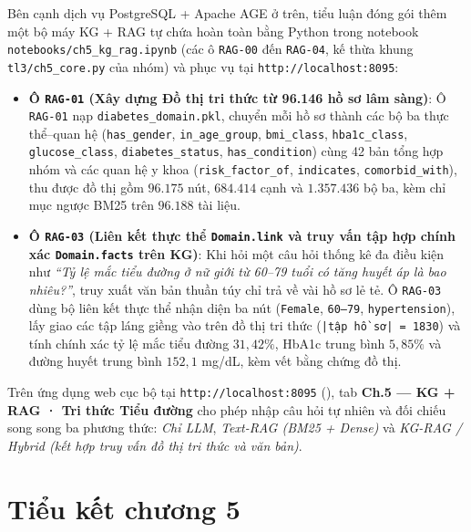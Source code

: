 Bên cạnh dịch vụ PostgreSQL + Apache AGE ở trên, tiểu luận đóng gói thêm một bộ máy KG + RAG tự chứa hoàn toàn bằng Python trong notebook \texttt{notebooks/ch5\_kg\_rag.ipynb} (các ô \texttt{RAG-00} đến \texttt{RAG-04}, kế thừa khung \texttt{tl3/ch5\_core.py} của nhóm) và phục vụ tại \texttt{http://localhost:8095}:
\begin{itemize}
  \item \textbf{Ô \texttt{RAG-01} (Xây dựng Đồ thị tri thức từ 96.146 hồ sơ lâm sàng)}: Ô \texttt{RAG-01} nạp \texttt{diabetes\_domain.pkl}, chuyển mỗi hồ sơ thành các bộ ba thực thể–quan hệ (\texttt{has\_gender}, \texttt{in\_age\_group}, \texttt{bmi\_class}, \texttt{hba1c\_class}, \texttt{glucose\_class}, \texttt{diabetes\_status}, \texttt{has\_condition}) cùng 42 bản tổng hợp nhóm và các quan hệ y khoa (\texttt{risk\_factor\_of}, \texttt{indicates}, \texttt{comorbid\_with}), thu được đồ thị gồm $96.175$ nút, $684.414$ cạnh và $1.357.436$ bộ ba, kèm chỉ mục ngược BM25 trên $96.188$ tài liệu.
  \item \textbf{Ô \texttt{RAG-03} (Liên kết thực thể \texttt{Domain.link} và truy vấn tập hợp chính xác \texttt{Domain.facts} trên KG)}: Khi hỏi một câu hỏi thống kê đa điều kiện như \emph{``Tỷ lệ mắc tiểu đường ở nữ giới từ 60–79 tuổi có tăng huyết áp là bao nhiêu?''}, truy xuất văn bản thuần túy chỉ trả về vài hồ sơ lẻ tẻ. Ô \texttt{RAG-03} dùng bộ liên kết thực thể nhận diện ba nút (\texttt{Female}, \texttt{60–79}, \texttt{hypertension}), lấy giao các tập láng giềng vào trên đồ thị tri thức (\texttt{|tập hồ sơ| = 1830}) và tính chính xác tỷ lệ mắc tiểu đường $31{,}42\%$, HbA1c trung bình $5{,}85\%$ và đường huyết trung bình $152{,}1$ mg/dL, kèm vết bằng chứng đồ thị.
\end{itemize}

Trên ứng dụng web cục bộ tại \texttt{http://localhost:8095} (), tab \textbf{Ch.5 — KG + RAG · Tri thức Tiểu đường} cho phép nhập câu hỏi tự nhiên và đối chiếu song song ba phương thức: \emph{Chỉ LLM}, \emph{Text-RAG (BM25 + Dense)} và \emph{KG-RAG / Hybrid (kết hợp truy vấn đồ thị tri thức và văn bản)}.


\section{Tiểu kết chương 5}

